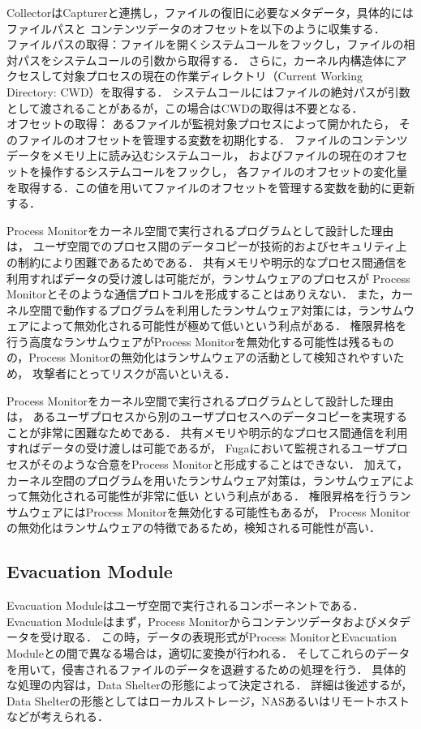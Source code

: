 CollectorはCapturerと連携し，ファイルの復旧に必要なメタデータ，具体的にはファイルパスと
コンテンツデータのオフセットを以下のように収集する．
\\
ファイルパスの取得：ファイルを開くシステムコールをフックし，ファイルの相対パスをシステムコールの引数から取得する．
さらに，カーネル内構造体にアクセスして対象プロセスの現在の作業ディレクトリ（Current Working Directory: CWD）を取得する．
システムコールにはファイルの絶対パスが引数として渡されることがあるが，この場合はCWDの取得は不要となる．
\\
オフセットの取得：
あるファイルが監視対象プロセスによって開かれたら，
そのファイルのオフセットを管理する変数を初期化する．
ファイルのコンテンツデータをメモリ上に読み込むシステムコール，
およびファイルの現在のオフセットを操作するシステムコールをフックし，
各ファイルのオフセットの変化量を取得する．この値を用いてファイルのオフセットを管理する変数を動的に更新する．

Process Monitorをカーネル空間で実行されるプログラムとして設計した理由は，
ユーザ空間でのプロセス間のデータコピーが技術的およびセキュリティ上の制約により困難であるためである．
共有メモリや明示的なプロセス間通信を利用すればデータの受け渡しは可能だが，ランサムウェアのプロセスが
Process Monitorとそのような通信プロトコルを形成することはありえない．
また，カーネル空間で動作するプログラムを利用したランサムウェア対策には，ランサムウェアによって無効化される可能性が極めて低いという利点がある\cite{mitigation-modern}．
権限昇格を行う高度なランサムウェアがProcess Monitorを無効化する可能性は残るものの，Process Monitorの無効化はランサムウェアの活動として検知されやすいため，
攻撃者にとってリスクが高いといえる．

Process Monitorをカーネル空間で実行されるプログラムとして設計した理由は，
あるユーザプロセスから別のユーザプロセスへのデータコピーを実現することが非常に困難なためである．
共有メモリや明示的なプロセス間通信を利用すればデータの受け渡しは可能であるが，
Fugaにおいて監視されるユーザプロセスがそのような合意をProcess Monitorと形成することはできない．
加えて，カーネル空間のプログラムを用いたランサムウェア対策は，ランサムウェアによって無効化される可能性が非常に低い \cite{mitigation-modern}という利点がある．
権限昇格を行うランサムウェアにはProcess Monitorを無効化する可能性もあるが，
Process Monitorの無効化はランサムウェアの特徴であるため，検知される可能性が高い．

\subsection{Evacuation Module}
Evacuation Moduleはユーザ空間で実行されるコンポーネントである．
Evacuation Moduleはまず，Process Monitorからコンテンツデータおよびメタデータを受け取る．
この時，データの表現形式がProcess MonitorとEvacuation Moduleとの間で異なる場合は，適切に変換が行われる．
そしてこれらのデータを用いて，侵害されるファイルのデータを退避するための処理を行う．
具体的な処理の内容は，Data Shelterの形態によって決定される．
詳細は後述するが，Data Shelterの形態としてはローカルストレージ，NASあるいはリモートホストなどが考えられる．

